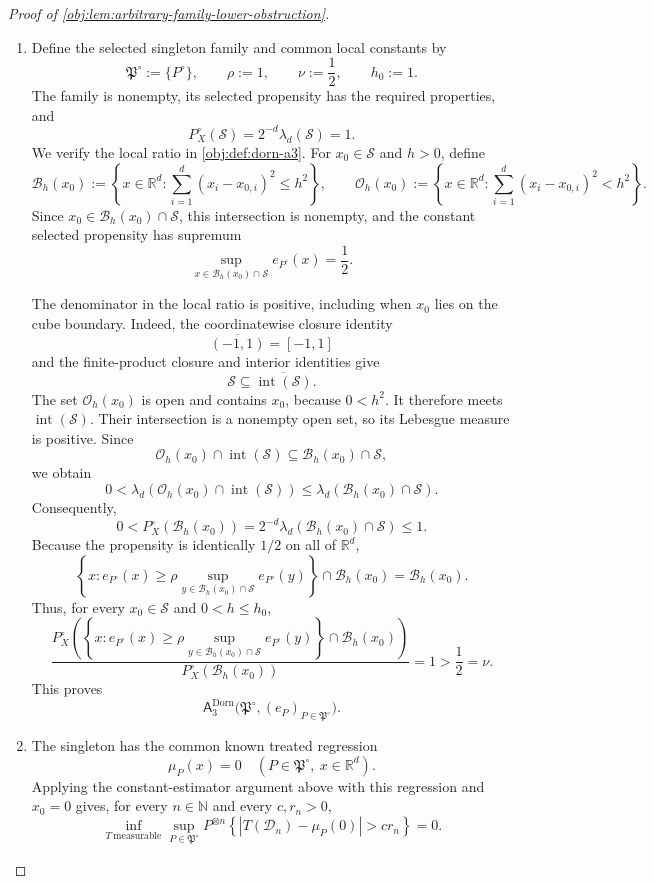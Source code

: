 \begin{proof}[Proof of \cref{obj:lem:arbitrary-family-lower-obstruction}]
\begin{enumerate}
\item Define the selected singleton family and common local constants by
\[
\mathfrak P^\circ:=\{P^\circ\},
\qquad
\rho:=1,\qquad \nu:=\frac12,\qquad h_0:=1.
\]
The family is nonempty, its selected propensity has the required properties, and
\[
P_X^\circ(\mathcal S)=2^{-d}\lambda_d(\mathcal S)=1.
\]
We verify the local ratio in \cref{obj:def:dorn-a3}. For \(x_0\in\mathcal S\) and \(h>0\), define
\[
\mathcal B_h(x_0)
:=
\left\{x\in\mathbb R^d:
\sum_{i=1}^d(x_i-x_{0,i})^2\le h^2\right\},
\qquad
\mathcal O_h(x_0)
:=
\left\{x\in\mathbb R^d:
\sum_{i=1}^d(x_i-x_{0,i})^2<h^2\right\}.
\]
Since \(x_0\in\mathcal B_h(x_0)\cap\mathcal S\), this intersection is nonempty, and the constant selected propensity has supremum
\[
\sup_{x\in\mathcal B_h(x_0)\cap\mathcal S}e_{P^\circ}(x)
=\frac12.
\]

The denominator in the local ratio is positive, including when \(x_0\) lies on the cube boundary. Indeed, the coordinatewise closure identity
\[
\overline{(-1,1)}=[-1,1]
\]
and the finite-product closure and interior identities give
\[
\mathcal S\subseteq\overline{\operatorname{int}(\mathcal S)}.
\]
The set \(\mathcal O_h(x_0)\) is open and contains \(x_0\), because \(0<h^2\). It therefore meets \(\operatorname{int}(\mathcal S)\). Their intersection is a nonempty open set, so its Lebesgue measure is positive. Since
\[
\mathcal O_h(x_0)\cap\operatorname{int}(\mathcal S)
\subseteq
\mathcal B_h(x_0)\cap\mathcal S,
\]
we obtain
\[
0<
\lambda_d\!\left(
\mathcal O_h(x_0)\cap\operatorname{int}(\mathcal S)
\right)
\le
\lambda_d\!\left(\mathcal B_h(x_0)\cap\mathcal S\right).
\]
Consequently,
\[
0<
P_X^\circ(\mathcal B_h(x_0))
=
2^{-d}\lambda_d\!\left(\mathcal B_h(x_0)\cap\mathcal S\right)
\le1.
\]
Because the propensity is identically \(1/2\) on all of \(\mathbb R^d\),
\[
\left\{x:
e_{P^\circ}(x)\ge
\rho\sup_{y\in\mathcal B_h(x_0)\cap\mathcal S}e_{P^\circ}(y)
\right\}
\cap\mathcal B_h(x_0)
=
\mathcal B_h(x_0).
\]
Thus, for every \(x_0\in\mathcal S\) and \(0<h\le h_0\),
\[
\frac{
P_X^\circ\!\left(
\left\{x:
e_{P^\circ}(x)\ge
\rho\sup_{y\in\mathcal B_h(x_0)\cap\mathcal S}e_{P^\circ}(y)
\right\}
\cap\mathcal B_h(x_0)
\right)}
{P_X^\circ(\mathcal B_h(x_0))}
=1>\frac12=\nu.
\]
This proves
\[
\mathsf A_3^{\mathrm{Dorn}}
\bigl(\mathfrak P^\circ,(e_P)_{P\in\mathfrak P^\circ}\bigr).
\]

\item The singleton has the common known treated regression
\[
\mu_P(x)=0
\quad(P\in\mathfrak P^\circ,\ x\in\mathbb R^d).
\]
Applying the constant-estimator argument above with this regression and \(x_0=0\) gives, for every \(n\in\mathbb N\) and every \(c,r_n>0\),
\[
\inf_{T\ \mathrm{measurable}}
\sup_{P\in\mathfrak P^\circ}
P^{\otimes n}
\left\{
|T(\mathcal D_n)-\mu_P(0)|>c r_n
\right\}
=0.
\]
\end{enumerate}
\end{proof}
